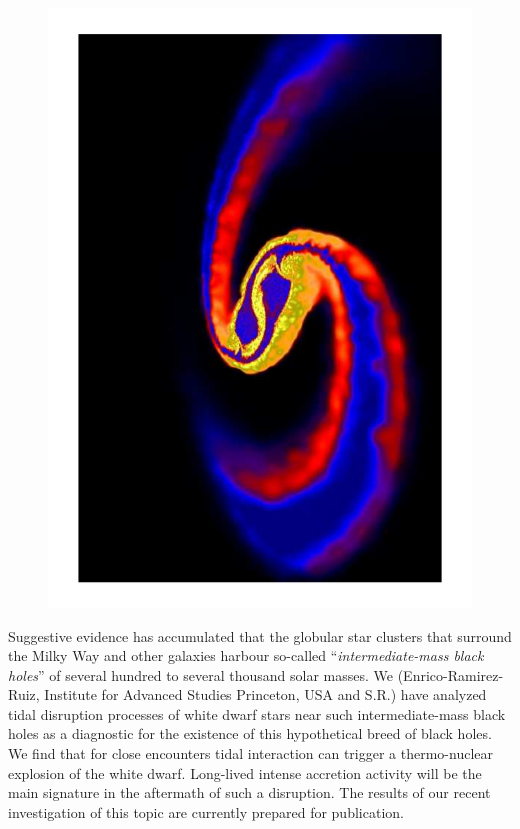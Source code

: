 \begin{figure}[ht]
  \begin{center}
    \includegraphics[height=\hsize, angle=270]{Rosswog/Rosswog_2006.pdf}
    \label{NSM_mag}
  \end{center}
\end{figure}

\noindent Suggestive evidence has accumulated that the globular star
clusters that surround the Milky Way and other galaxies harbour
so-called ``{\em intermediate-mass black holes}'' of several hundred to
several thousand solar masses. We (Enrico-Ramirez-Ruiz, Institute for
Advanced Studies Princeton, USA and S.R.) have analyzed tidal disruption
processes of white dwarf stars near such intermediate-mass
black holes as a diagnostic for the existence of this hypothetical breed
of black holes. We find that for close encounters tidal interaction can
trigger a thermo-nuclear explosion of the white dwarf. Long-lived intense
accretion activity will be the main signature in the aftermath of such a
disruption. The results of our recent investigation of this topic
are currently prepared for publication.

